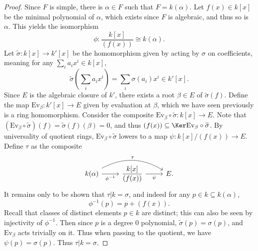 \documentclass[11pt, letterpaper]{article}
\begin{document}
\begin{proof}
	Since $F$ is simple, there is $\alpha \in F$ such that $F=k(\alpha )$. Let $f(x)\in k[x]$ be the minimal polynomial of $\alpha $, which exists since $F$ is algebraic, and thus so is $\alpha $. This yields the isomorphism
	\[
		\phi : \frac{k[x]}{(f(x))}  \cong  k(\alpha )
	.\]
	Let $\widetilde{\sigma } : k[x] \to k'[x]$ be the homomorphism given by acting by $\sigma $ on coefficients, meaning for any $\sum_{i} a_ix^i\in k[x]$,
	\[
		\widetilde{\sigma } \left( \sum_{i} a_ix^i \right) =\sum_{i} \sigma (a_i)x^i\in k'[x]
	.\]
	Since $E$ is the algebraic closure of $k'$, there exists a root $\beta \in E$ of $\widetilde{\sigma } (f)$. Define the map $\mathrm{Ev}_\beta : k'[x] \to E$ given by evaluation at $\beta $, which we have seen previously is a ring homomorphism. Consider the composite $\mathrm{Ev} _\beta \circ \widetilde{\sigma } : k[x] \to E$. Note that $(\mathrm{Ev} _\beta \circ \widetilde{\sigma } )(f)= \widetilde{\sigma } (f)(\beta )=0$, and thus $(f(x))\subseteq \Ker \mathrm{Ev} _\beta \circ \widetilde{\sigma } $. By universality of quotient rings, $\mathrm{Ev} _\beta \circ \widetilde{\sigma } $ lowers to a map $ \psi : k[x] /(f(x)) \to E$. Define $\tau $ as the composite
	\[\begin{tikzcd}[row sep = 2.5em, column sep = 2.5em]
		k(\alpha )\ar[" \tau  ", bend left, rr] \ar[" \phi ^{-1}  "', r]  & \displaystyle{\frac{k[x]}{(f(x))} }\ar[" \psi  "', r]  & E.
	\end{tikzcd}\]
	It remains only to be shown that $\tau |k=\sigma $, and indeed for any $p\in k \subseteq k(\alpha )$,
	\[
		\phi ^{-1} (p)=p + (f(x))
	.\]
	Recall that classes of distinct elements $p\in k$ are distinct; this can also be  seen by injectivity of $\phi ^{-1} $. Then since $p$ is a degree 0 polynomial, $\widetilde{\sigma } (p)=\sigma (p)$, and $\mathrm{Ev} _\beta $ acts trivially on it. Thus when passing to the quotient, we have $\psi (p)=\sigma (p)$. Thus $\tau |k=\sigma $.
\end{proof}
\end{document}
